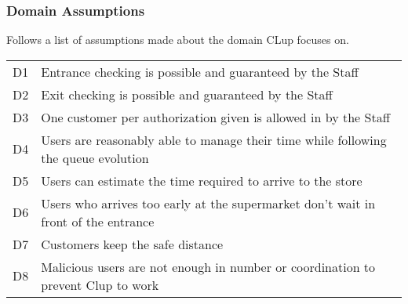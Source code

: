 \subsubsection{Domain Assumptions}
Follows a list of assumptions made about the domain CLup focuses on.\newline\newline
\begin{tabular}{l|l}
	D1 & Entrance checking is possible and guaranteed by the Staff\\
	D2 & Exit checking is possible and guaranteed by the Staff\\
	D3 & One customer per authorization given is allowed in by the Staff\\
	D4 & Users are reasonably able to manage their time while following the queue evolution\\
    D5 & Users can estimate the time required to arrive to the store\\
    D6 & Users who arrives too early at the supermarket don't wait in front of the entrance\\
    D7 & Customers keep the safe distance\\
    D8 & Malicious users are not enough in number or coordination to prevent Clup to work\\

	
\end{tabular}
